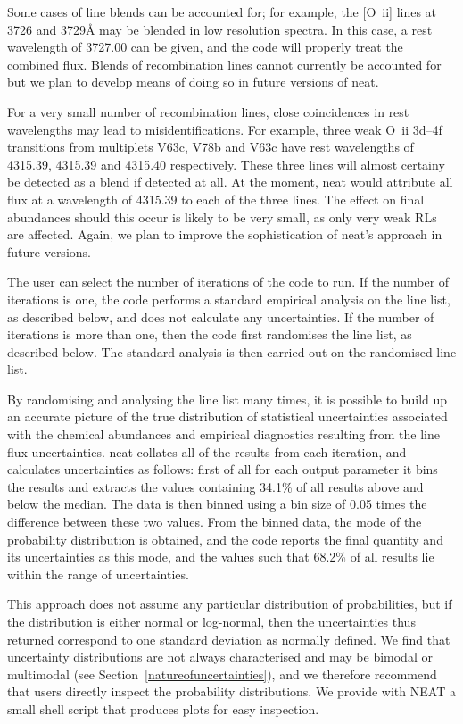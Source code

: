 \documentclass[useAMS,usenatbib]{mn2e}
\begin{document}
Some cases of line blends can be accounted for; for example, the [O~{\sc ii}] lines at 3726 and 3729{\AA} may be blended in low resolution spectra.  In this case, a rest wavelength of 3727.00 can be given, and the code will properly treat the combined flux.  Blends of recombination lines cannot currently be accounted for but we plan to develop means of doing so in future versions of {\sc neat}.

For a very small number of recombination lines, close coincidences in rest wavelengths may lead to misidentifications.  For example, three weak O~{\sc ii} 3d--4f transitions from multiplets V63c, V78b and V63c have rest wavelengths of 4315.39, 4315.39 and 4315.40 respectively.  These three lines will almost certainy be detected as a blend if detected at all.  At the moment, {\sc neat} would attribute all flux at a wavelength of 4315.39 to each of the three lines.  The effect on final abundances should this occur is likely to be very small, as only very weak RLs are affected.  Again, we plan to improve the sophistication of {\sc neat}'s approach in future versions.

The user can select the number of iterations of the code to run.  If the number of iterations is one, the code performs a standard empirical analysis on the line list, as described below, and does not calculate any uncertainties.  If the number of iterations is more than one, then the code first randomises the line list, as described below.  The standard analysis is then carried out on the randomised line list.

By randomising and analysing the line list many times, it is possible to build up an accurate picture of the true distribution of statistical uncertainties associated with the chemical abundances and empirical diagnostics resulting from the line flux uncertainties. {\sc neat} collates all of the results from each iteration, and calculates uncertainties as follows: first of all for each output parameter it bins the results and extracts the values containing 34.1\% of all results above and below the median.  The data is then binned using a bin size of 0.05 times the difference between these two values.  From the binned data, the mode of the probability distribution is obtained, and the code reports the final quantity and its uncertainties as this mode, and the values such that 68.2\% of all results lie within the range of uncertainties.

This approach does not assume any particular distribution of probabilities, but if the distribution is either normal or log-normal, then the uncertainties thus returned correspond to one standard deviation as normally defined.  We find that uncertainty distributions are not always characterised and may be bimodal or multimodal (see Section~\ref{natureofuncertainties}), and we therefore recommend that users directly inspect the probability distributions.  We provide with {\sc NEAT} a small shell script that produces plots for easy inspection.
\end{document}
